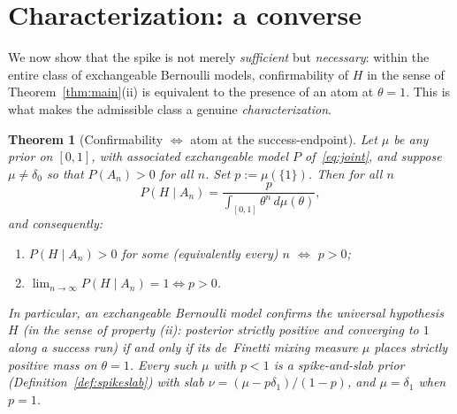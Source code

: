 \documentclass{amsart}
\newtheorem{theorem}{Theorem}
\theoremstyle{definition}
\begin{document}
\section{Characterization: a converse}\label{sec:converse}

We now show that the spike is not merely \emph{sufficient} but \emph{necessary}:
within the entire class of exchangeable Bernoulli models, confirmability of $H$
in the sense of Theorem~\ref{thm:main}(ii) is equivalent to the presence of an
atom at $\theta=1$. This is what makes the admissible class a genuine
\emph{characterization}.

\begin{theorem}[Confirmability $\iff$ atom at the success-endpoint]\label{thm:converse}
Let $\mu$ be any prior on $[0,1]$, with associated exchangeable model $P$
of~\eqref{eq:joint}, and suppose $\mu\ne\delta_0$ so that $P(A_n)>0$ for all $n$.
Set $p:=\mu(\{1\})$. Then for all $n$
\begin{equation}\label{eq:general}
  P(H\mid A_n)=\frac{p}{\int_{[0,1]}\theta^n\,d\mu(\theta)} ,
\end{equation}
and consequently:
\begin{enumerate}
\item[\textup{(a)}] $P(H\mid A_n)>0$ for some (equivalently every) $n$ $\iff$
$p>0$;
\item[\textup{(b)}] $\displaystyle\lim_{n\to\infty}P(H\mid A_n)=1 \iff p>0$.
\end{enumerate}
In particular, an exchangeable Bernoulli model confirms the universal hypothesis
$H$ (in the sense of property (ii): posterior strictly positive and converging to
$1$ along a success run) \emph{if and only if} its de~Finetti mixing measure
$\mu$ places strictly positive mass on $\theta=1$. Every such $\mu$ with $p<1$
is a spike-and-slab prior (Definition~\ref{def:spikeslab}) with slab
$\nu=(\mu-p\delta_1)/(1-p)$, and $\mu=\delta_1$ when $p=1$.
\end{theorem}
\end{document}
